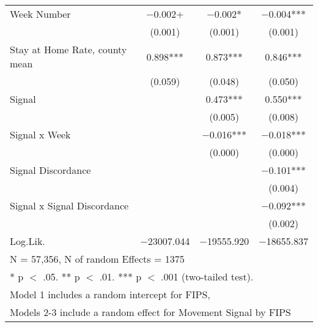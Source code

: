 \begin{table}[!ht]
\begin{tabular}{lccc}
Week Number & \num{-0.002}+ & \num{-0.002}* & \num{-0.004}***\\
 & (\num{0.001}) & (\num{0.001}) & (\num{0.001})\\
Stay at Home Rate, county mean & \num{0.898}*** & \num{0.873}*** & \num{0.846}***\\
 & (\num{0.059}) & (\num{0.048}) & (\num{0.050})\\
Signal &  & \num{0.473}*** & \num{0.550}***\\
 &  & (\num{0.005}) & (\num{0.008})\\
Signal x Week &  & \num{-0.016}*** & \num{-0.018}***\\
 &  & (\num{0.000}) & (\num{0.000})\\
Signal Discordance &  &  & \num{-0.101}***\\
 &  &  & (\num{0.004})\\
Signal x Signal Discordance &  &  & \num{-0.092}***\\
 &  &  & (\num{0.002})\\
\midrule
Log.Lik. & \num{-23007.044} & \num{-19555.920} & \num{-18655.837}\\
\bottomrule
\multicolumn{4}{l}{\rule{0pt}{1em}N = 57,356, N of random Effects = 1375}\\
\multicolumn{4}{l}{\rule{0pt}{1em}* p $<$ .05. ** p $<$ .01. *** p $<$ .001 (two-tailed test).}\\
\multicolumn{4}{l}{\rule{0pt}{1em}Model 1 includes a random intercept for FIPS,}\\
\multicolumn{4}{l}{\rule{0pt}{1em}Models 2-3 include a random effect for Movement Signal by FIPS}\\
\end{tabular}
\end{table}